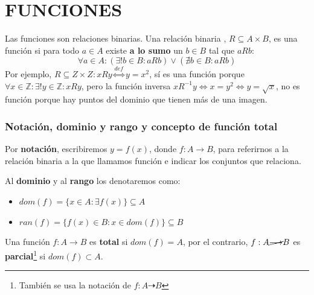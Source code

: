 \documentclass[10pt,a4paper,openright]{book}
\begin{document}
\section*{FUNCIONES}
Las funciones son relaciones binarias. Una relación binaria , $R\subseteq A\times B$, es una función si para todo $a\in A$ existe \textbf{a lo sumo} un $b\in B$ tal que $aRb$:
$$\forall a \in A: (\exists! b\in B: aRb)\vee (\nexists b\in B: aRb)$$
Por ejemplo, $R\subseteq Z\times Z: xRy\stackrel{def}{\Leftrightarrow} y=x^2$, sí es una función porque $\forall x\in \mathbb Z: \exists! y\in \mathbb Z: xRy$, pero la función inversa $xR^{-1}y\Leftrightarrow x=y^2\Leftrightarrow y=\sqrt{x}$, no es función porque hay puntos del dominio que tienen más de una imagen.

\subsubsection*{Notación, dominio y rango y concepto de función total}
Por \textbf{notación}, escribiremos $y=f(x)$, donde $f:A\rightarrow B$, para referirnos a la relación binaria a la que llamamos función e indicar los conjuntos que relaciona.\par
Al \textbf{dominio} y al \textbf{rango} los denotaremos como:
\begin{itemize}
\item $dom (f)=\{x\in A: \exists f(x)\}\subseteq A$
\item $ran (f)=\{f(x)\in B: x\in dom (f)\}\subseteq B$
\end{itemize}

Una función $f: A\rightarrow B$ es \textbf{total} si $dom(f)=A$, por el contrario, $f: A\cancel{\longrightarrow}B$ es \textbf{parcial}\footnote{También se usa la notación de $f: A \dashrightarrow B$} si $dom(f)\subset A$.
\end{document}
